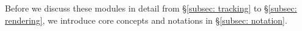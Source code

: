 Before we discuss these modules in detail from \S\ref{subsec: tracking} to \S\ref{subsec: rendering}, we introduce core concepts and notations in \S\ref{subsec: notation}.








